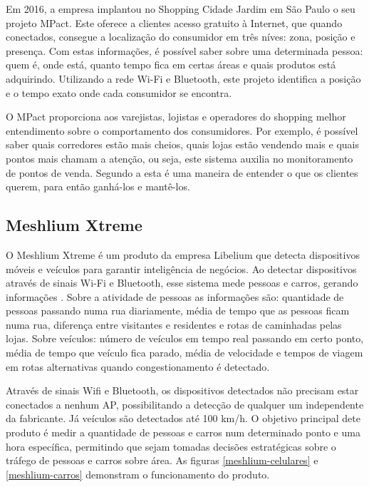Em 2016, a empresa implantou no Shopping Cidade Jardim em São Paulo o seu
projeto MPact. Este oferece a clientes acesso gratuito à Internet, que quando
conectados, consegue a localização do consumidor em três níves: zona, posição e
presença. Com estas informações, é possível saber sobre uma determinada pessoa:
quem é, onde está, quanto tempo fica em certas áreas e quais produtos está
adquirindo. Utilizando a rede Wi-Fi e Bluetooth, este projeto identifica a
posição e o tempo exato onde cada consumidor se encontra.

O MPact proporciona aos varejistas, lojistas e operadores do shopping melhor
entendimento sobre o comportamento dos consumidores. Por exemplo, é possível
saber quais corredores estão mais cheios, quais lojas estão vendendo mais e
quais pontos mais chamam a atenção, ou seja, este sistema auxilia no
monitoramento de pontos de venda. Segundo a  esta é uma
maneira de entender o que os clientes querem, para então ganhá-los e mantê-los.

\subsection{Meshlium Xtreme}
O Meshlium Xtreme é um produto da empresa Libelium
que detecta dispositivos móveis e veículos para garantir inteligência de
negócios. Ao detectar dispositivos através de sinais Wi-Fi e Bluetooth, esse
sistema mede pessoas e carros, gerando informações \cite{libelium}. Sobre a
atividade de pessoas as informações são: quantidade de pessoas passando numa rua
diariamente, média de tempo que as pessoas ficam numa rua, diferença entre
visitantes e residentes e rotas de caminhadas pelas lojas. Sobre veículos:
número de veículos em tempo real passando em certo ponto, média de tempo que
veículo fica parado, média de velocidade e tempos de viagem em rotas
alternativas quando congestionamento é detectado.

Através de sinais Wifi e Bluetooth, os dispositivos detectados não precisam
estar conectados a nenhum AP, possibilitando a detecção de qualquer um
independente da fabricante. Já veículos são detectados até 100 km/h. O objetivo
principal dete produto é medir a quantidade de pessoas e carros num determinado
ponto e uma hora específica, permitindo que sejam tomadas decisões estratégicas
sobre o tráfego de pessoas e carros sobre área. As figuras
\autoref{meshlium-celulares} e \autoref{meshlium-carros} demonstram o
funcionamento do produto.


